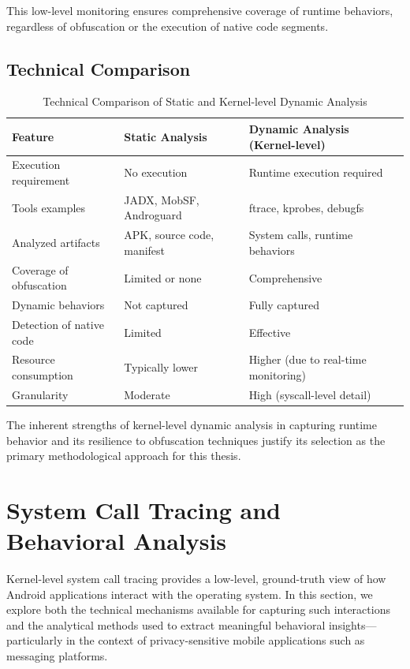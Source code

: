 \documentclass[a4paper,12pt]{report}
\begin{document}
This low-level monitoring ensures comprehensive coverage of runtime behaviors, regardless of obfuscation or the execution of native code segments.

\subsection{Technical Comparison}

\begin{table}[h]
\centering
\begin{tabular}{|l|l|l|}
\hline
\textbf{Feature} & \textbf{Static Analysis} & \textbf{Dynamic Analysis (Kernel-level)} \\
\hline
Execution requirement & No execution & Runtime execution required \\ \hline
Tools examples & JADX, MobSF, Androguard & ftrace, kprobes, debugfs \\ \hline
Analyzed artifacts & APK, source code, manifest & System calls, runtime behaviors \\ \hline
Coverage of obfuscation & Limited or none & Comprehensive \\ \hline
Dynamic behaviors & Not captured & Fully captured \\ \hline
Detection of native code & Limited & Effective \\ \hline
Resource consumption & Typically lower & Higher (due to real-time monitoring) \\ \hline
Granularity & Moderate & High (syscall-level detail) \\ \hline
\end{tabular}
\caption{Technical Comparison of Static and Kernel-level Dynamic Analysis}
\label{table:comparison}
\end{table}

The inherent strengths of kernel-level dynamic analysis in capturing runtime behavior and its resilience to obfuscation techniques justify its selection as the primary methodological approach for this thesis.


\section{System Call Tracing and Behavioral Analysis}

Kernel-level system call tracing provides a low-level, ground-truth view of how Android applications interact with the operating system. In this section, we explore both the technical mechanisms available for capturing such interactions and the analytical methods used to extract meaningful behavioral insights—particularly in the context of privacy-sensitive mobile applications such as messaging platforms.
\end{document}
